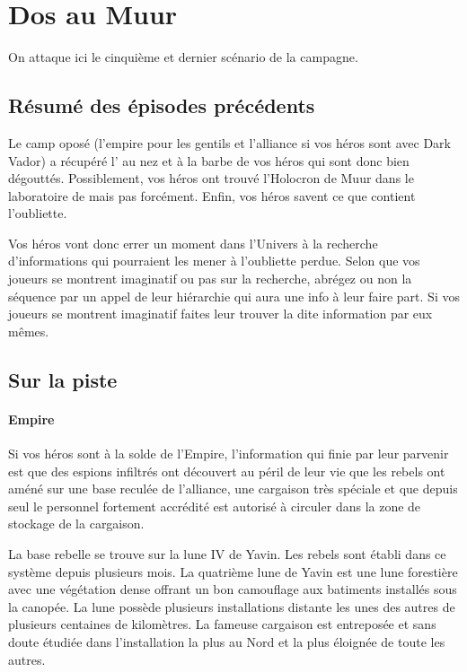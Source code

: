 \section{Dos au Muur}
On attaque ici le cinquième et dernier scénario de la campagne.

\subsection{Résumé des épisodes précédents}
Le camp oposé (l’empire pour les gentils et l’alliance si vos héros sont avec Dark Vador) a récupéré l’ au nez et à la barbe de vos héros qui sont donc bien dégouttés. Possiblement, vos héros ont trouvé l'Holocron de Muur dans le laboratoire de  mais pas forcément. Enfin, vos héros savent ce que contient l’oubliette.

Vos héros vont donc errer un moment dans l’Univers à la recherche d’informations qui pourraient les mener à l’oubliette perdue. Selon que vos joueurs se montrent imaginatif ou pas sur la recherche, abrégez ou non la séquence par un appel de leur hiérarchie qui aura une info à leur faire part. Si vos joueurs se montrent imaginatif faites leur trouver la dite information par eux mêmes.

\subsection{Sur la piste}
\paragraph{Empire}
Si vos héros sont à la solde de l’Empire, l’information qui finie par leur parvenir est que des espions infiltrés ont découvert au péril de leur vie que les rebels ont améné sur une base reculée de l’alliance, une cargaison très spéciale et que depuis seul le personnel fortement accrédité est autorisé à circuler dans la zone de stockage de la cargaison.

La base rebelle se trouve sur la lune IV de Yavin. Les rebels sont établi dans ce système depuis plusieurs mois. La quatrième lune de Yavin est une lune forestière avec une végétation dense offrant un bon camouflage aux batiments installés sous la canopée. La lune possède plusieurs installations distante les unes des autres de plusieurs centaines de kilomètres. La fameuse cargaison est entreposée et sans doute étudiée dans l’installation la plus au Nord et la plus éloignée de toute les autres.

